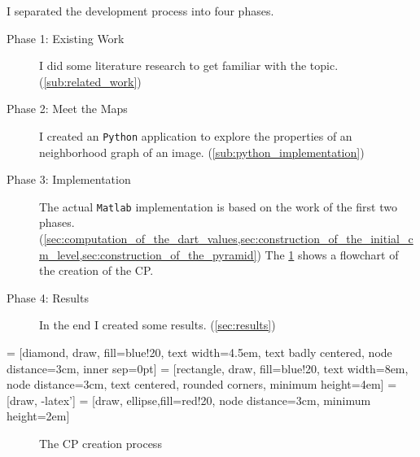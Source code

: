 \documentclass[12pt]{article}
\begin{document}
I separated the development process into four phases.

\begin{description}
  \item[Phase 1: Existing Work] I did some literature research to get familiar with the topic. (\cref{sub:related_work})
  \item[Phase 2: Meet the Maps] I created an \texttt{Python} application to explore the properties of an neighborhood graph of an image. (\cref{sub:python_implementation})
  \item[Phase 3: Implementation] The actual \texttt{Matlab} implementation is based on the work of the first two phases. (\cref{sec:computation_of_the_dart_values,sec:construction_of_the_initial_cm_level,sec:construction_of_the_pyramid})
  The \cref{fig:cp_creation_process} shows a flowchart of the creation of the CP\@.
  \item[Phase 4: Results] In the end I created some results. (\cref{sec:results})
\end{description}


 = [diamond, draw, fill=blue!20,
    text width=4.5em, text badly centered, node distance=3cm, inner sep=0pt]
 = [rectangle, draw, fill=blue!20,
    text width=8em, node distance=3cm, text centered, rounded corners, minimum height=4em]
 = [draw, -latex']
 = [draw, ellipse,fill=red!20, node distance=3cm,
    minimum height=2em]
\begin{figure}[tb]
  \centering
  \caption{The CP creation process}%
  \label{fig:cp_creation_process}
\end{figure}
\end{document}
